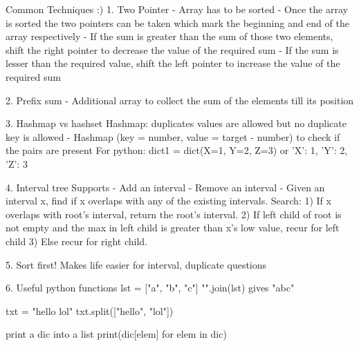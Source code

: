 Common Techniques :)
1. Two Pointer 
- Array has to be sorted
- Once the array is sorted the two pointers can be taken which mark the beginning and end of the array respectively
- If the sum is greater than the sum of those two elements, shift the right pointer to decrease the value of the required sum 
- If the sum is lesser than the required value, shift the left pointer to increase the value of the required sum 

2. Prefix sum
- Additional array to collect the sum of the elements till its position 

3. Hashmap vs hashset
Hashmap: duplicates values are allowed but no duplicate key is allowed 
- Hashmap (key = number, value = target - number) to check if the pairs are present
For python:
dict1 = dict(X=1, Y=2, Z=3)
or {'X': 1, 'Y': 2, 'Z': 3}

4. Interval tree
Supports 
- Add an interval 
- Remove an interval 
- Given an interval x, find if x overlaps with any of the existing intervals.
Search:
1) If x overlaps with root's interval, return the root's interval.
2) If left child of root is not empty and the max in left child 
is greater than x's low value, recur for left child
3) Else recur for right child.

5. Sort first!
Makes life easier for interval, duplicate questions

6. Useful python functions
lst = ["a", "b", "c"] 
"".join(lst) gives "abc"

txt = "hello lol"
txt.split(["hello", "lol"])

print a dic into a list
print(dic[elem] for elem in dic)

